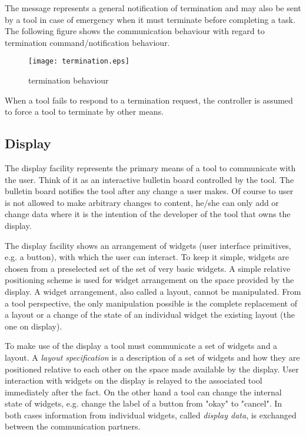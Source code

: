 \documentclass{article}
\begin{document}
   \enlargethispage*{30pt}

   \noindent The message represents a general notification of termination and
   may also be sent by a tool in case of emergency when it must terminate
   before completing a task.
   The following figure shows the communication behaviour with regard to
   termination command/notification behaviour.

   \begin{figure}[H]
    \begin{center}
     \texttt{[image: termination.eps]}
    \end{center}
    \vspace{-0.5cm}
    \caption{termination behaviour}
   \end{figure} 
   
   \noindent When a tool fails to respond to a termination request, the
   controller is assumed to force a tool to terminate by other means.

  \subsection{Display} \label{ss:user_interaction}

   The display facility represents the primary means of a tool to communicate
   with the user.  Think of it as an interactive bulletin board controlled by
   the tool. The bulletin board notifies the tool after any change a user
   makes. Of course to user is not allowed to make arbitrary changes to
   content, he/she can only add or change data where it is the intention of the
   developer of the tool that owns the display.

   The display facility shows an arrangement of widgets (user interface
   primitives, e.g. a button), with which the user can interact. To keep it
   simple, widgets are chosen from a preselected set of the set of very basic
   widgets. A simple relative positioning scheme is used for widget arrangement
   on the space provided by the display. A widget arrangement, also called a
   layout, cannot be manipulated. From a tool perspective, the only
   manipulation possible is the complete replacement of a layout or a change of
   the state of an individual widget the existing layout (the one on display).

   To make use of the display a tool must communicate a set of widgets and a
   layout.  A \textit{layout specification} is a description of a set of
   widgets and how they are positioned relative to each other on the space made
   available by the display. User interaction with widgets on the display
   is relayed to the associated tool immediately after the fact. On the other
   hand a tool can change the internal state of widgets, e.g. change the label
   of a button from "okay" to "cancel". In both cases information from
   individual widgets, called \textit{display data}, is exchanged between the
   communication partners.
\end{document}
